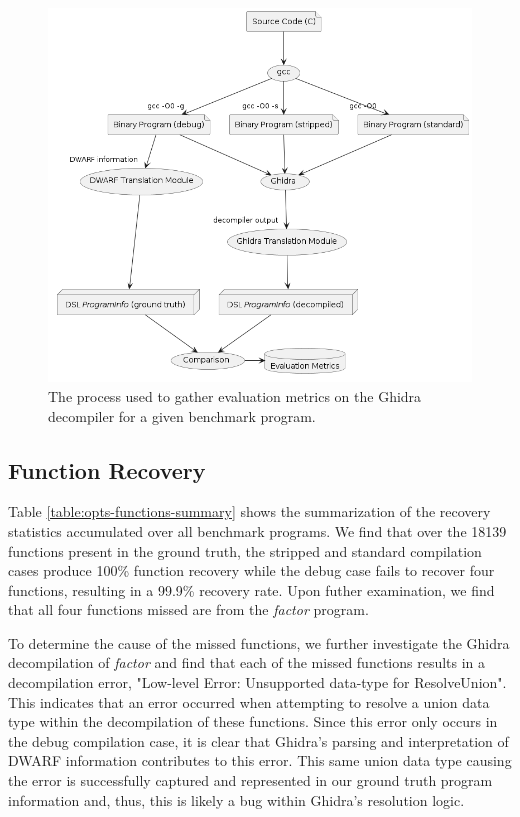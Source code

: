 \documentclass[a4paper,twoside]{article}
\begin{document}
\begin{figure}[htb]
    \centering
    \includegraphics[width=\columnwidth]{./figures/evaluation-process.png}
    \caption{The process used to gather evaluation metrics on the Ghidra decompiler for a given benchmark program.}
    \label{fig:evaluation-process}
\end{figure}

\subsection{Function Recovery}



Table \ref{table:opts-functions-summary} shows the summarization of the recovery statistics accumulated over all benchmark programs. We find that over the 18139 functions present in the ground truth, the stripped and standard compilation cases produce 100\% function recovery while the debug case fails to recover four functions, resulting in a 99.9\% recovery rate. Upon futher examination, we find that all four functions missed are from the \emph{factor} program.

To determine the cause of the missed functions, we further investigate the Ghidra decompilation of \emph{factor} and find that each of the missed functions results in a decompilation error, "Low-level Error: Unsupported data-type for ResolveUnion". This indicates that an error occurred when attempting to resolve a union data type within the decompilation of these functions. Since this error only occurs in the debug compilation case, it is clear that Ghidra's parsing and interpretation of DWARF information contributes to this error. This same union data type causing the error is successfully captured and represented in our ground truth program information and, thus, this is likely a bug within Ghidra's resolution logic.
\end{document}

